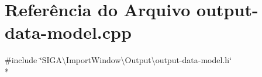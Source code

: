 \section{Referência do Arquivo output-\/data-\/model.cpp}
\label{output-data-model_8cpp}
{\ttfamily \#include \char`\"{}S\+I\+G\+A\textbackslash{}\+Import\+Window\textbackslash{}\+Output\textbackslash{}output-\/data-\/model.\+h\char`\"{}}\\*
